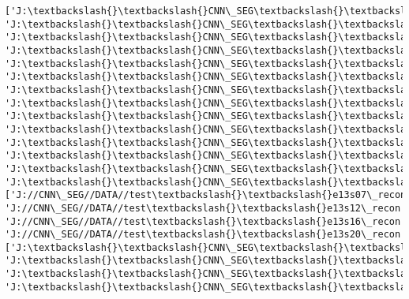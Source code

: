 \documentclass[11pt]{article}
\begin{document}
\begin{Verbatim}[commandchars=\\\{\}]
['J:\textbackslash{}\textbackslash{}CNN\_SEG\textbackslash{}\textbackslash{}DATA\textbackslash{}\textbackslash{}train\textbackslash{}\textbackslash{}e13s03\_seg', 'J:\textbackslash{}\textbackslash{}CNN\_SEG\textbackslash{}\textbackslash{}DATA\textbackslash{}\textbackslash{}train\textbackslash{}\textbackslash{}e13s04\_seg', 'J:\textbackslash{}\textbackslash{}CNN\_SEG\textbackslash{}\textbackslash{}DATA\textbackslash{}\textbackslash{}train\textbackslash{}\textbackslash{}e13s05\_seg', 'J:\textbackslash{}\textbackslash{}CNN\_SEG\textbackslash{}\textbackslash{}DATA\textbackslash{}\textbackslash{}train\textbackslash{}\textbackslash{}e13s06\_seg', 'J:\textbackslash{}\textbackslash{}CNN\_SEG\textbackslash{}\textbackslash{}DATA\textbackslash{}\textbackslash{}train\textbackslash{}\textbackslash{}e13s08\_seg', 'J:\textbackslash{}\textbackslash{}CNN\_SEG\textbackslash{}\textbackslash{}DATA\textbackslash{}\textbackslash{}train\textbackslash{}\textbackslash{}e13s09\_seg', 'J:\textbackslash{}\textbackslash{}CNN\_SEG\textbackslash{}\textbackslash{}DATA\textbackslash{}\textbackslash{}train\textbackslash{}\textbackslash{}e13s10\_seg', 'J:\textbackslash{}\textbackslash{}CNN\_SEG\textbackslash{}\textbackslash{}DATA\textbackslash{}\textbackslash{}train\textbackslash{}\textbackslash{}e13s11\_seg', 'J:\textbackslash{}\textbackslash{}CNN\_SEG\textbackslash{}\textbackslash{}DATA\textbackslash{}\textbackslash{}train\textbackslash{}\textbackslash{}e13s13\_seg', 'J:\textbackslash{}\textbackslash{}CNN\_SEG\textbackslash{}\textbackslash{}DATA\textbackslash{}\textbackslash{}train\textbackslash{}\textbackslash{}e13s14\_seg', 'J:\textbackslash{}\textbackslash{}CNN\_SEG\textbackslash{}\textbackslash{}DATA\textbackslash{}\textbackslash{}train\textbackslash{}\textbackslash{}e13s15\_seg', 'J:\textbackslash{}\textbackslash{}CNN\_SEG\textbackslash{}\textbackslash{}DATA\textbackslash{}\textbackslash{}train\textbackslash{}\textbackslash{}e13s17\_seg', 'J:\textbackslash{}\textbackslash{}CNN\_SEG\textbackslash{}\textbackslash{}DATA\textbackslash{}\textbackslash{}train\textbackslash{}\textbackslash{}e13s18\_seg', 'J:\textbackslash{}\textbackslash{}CNN\_SEG\textbackslash{}\textbackslash{}DATA\textbackslash{}\textbackslash{}train\textbackslash{}\textbackslash{}e13s19\_seg']
['J://CNN\_SEG//DATA//test\textbackslash{}\textbackslash{}e13s07\_recon', 'J://CNN\_SEG//DATA//test\textbackslash{}\textbackslash{}e13s12\_recon', 'J://CNN\_SEG//DATA//test\textbackslash{}\textbackslash{}e13s16\_recon', 'J://CNN\_SEG//DATA//test\textbackslash{}\textbackslash{}e13s20\_recon']
['J:\textbackslash{}\textbackslash{}CNN\_SEG\textbackslash{}\textbackslash{}DATA\textbackslash{}\textbackslash{}test\textbackslash{}\textbackslash{}e13s07\_seg', 'J:\textbackslash{}\textbackslash{}CNN\_SEG\textbackslash{}\textbackslash{}DATA\textbackslash{}\textbackslash{}test\textbackslash{}\textbackslash{}e13s12\_seg', 'J:\textbackslash{}\textbackslash{}CNN\_SEG\textbackslash{}\textbackslash{}DATA\textbackslash{}\textbackslash{}test\textbackslash{}\textbackslash{}e13s16\_seg', 'J:\textbackslash{}\textbackslash{}CNN\_SEG\textbackslash{}\textbackslash{}DATA\textbackslash{}\textbackslash{}test\textbackslash{}\textbackslash{}e13s20\_seg']

    \end{Verbatim}
\end{document}
